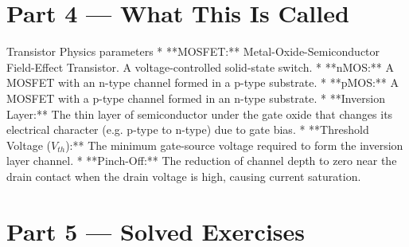 \documentclass[12pt, a4paper]{book}
\begin{document}
\newpage

\section{Part 4 --- What This Is Called}

\begin{namedconcept}{Transistor Physics parameters}
* **MOSFET:** Metal-Oxide-Semiconductor Field-Effect Transistor. A voltage-controlled solid-state switch.
* **nMOS:** A MOSFET with an n-type channel formed in a p-type substrate.
* **pMOS:** A MOSFET with a p-type channel formed in an n-type substrate.
* **Inversion Layer:** The thin layer of semiconductor under the gate oxide that changes its electrical character (e.g. p-type to n-type) due to gate bias.
* **Threshold Voltage ($V_{th}$):** The minimum gate-source voltage required to form the inversion layer channel.
* **Pinch-Off:** The reduction of channel depth to zero near the drain contact when the drain voltage is high, causing current saturation.
\end{namedconcept}

\newpage

\section{Part 5 --- Solved Exercises}
\end{document}
